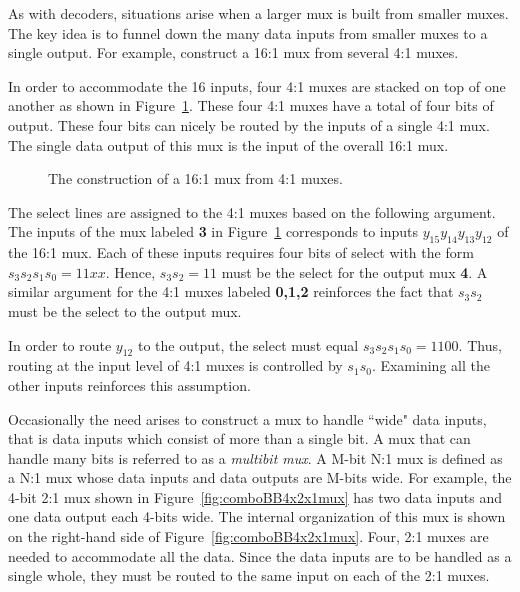 As with decoders, situations arise when a larger
mux is built from smaller muxes.  The key idea is to funnel down the many data 
inputs from smaller muxes to a single output.  For example, construct 
a 16:1 mux from several 4:1 muxes.  

In order to accommodate the 16 inputs, four 4:1 muxes are stacked
on top of one another as shown in Figure~\ref{fig:comboBBBigMux}.  These
four 4:1 muxes have a total of four bits of output.  These four bits
can nicely be routed by the inputs of a single 4:1 mux.  The
single data output of this mux is the input of the overall 16:1 mux.

\begin{figure}[ht]
\caption{The construction of a 16:1 mux from 4:1 muxes.}
\label{fig:comboBBBigMux}
\end{figure}

The select lines are assigned to the 4:1 muxes based on the following 
argument.  The inputs of the mux labeled \textbf{ 3} in
Figure~\ref{fig:comboBBBigMux} corresponds to inputs $y_{15} y_{14} y_{13} y_{12}$ 
of the 16:1 mux.  Each of these inputs requires four bits of 
select with the form $s_3 s_2 s_1 s_0 = 11xx$.  Hence, $s_3 s_2 = 11$ 
must be the select for the output mux \textbf{ 4}.  
A similar argument for the 4:1
muxes labeled \textbf{ 0,1,2} reinforces the fact that $s_3 s_2$ must be 
the select to the output mux.

In order to route $y_{12}$ to the output, the select must equal
$s_3 s_2 s_1 s_0 = 1100$.  Thus, routing at the input level of 4:1 
muxes is controlled by $s_1 s_0$.  Examining all the other 
inputs reinforces this assumption.

Occasionally the need arises to construct a mux to handle
``wide" data inputs, that is data inputs which consist of more than
a single bit.  A mux that can handle many bits is referred to 
as a \textit{ multibit mux}.  \label{multibit mux} A M-bit N:1 mux is 
defined as a N:1 mux whose data inputs and data outputs are M-bits
wide.  For example, the 4-bit 2:1 mux shown in Figure~\ref{fig:comboBB4x2x1mux} 
has two data inputs and one data output each 4-bits wide.  The internal
organization of this mux is shown on the right-hand side of 
Figure~\ref{fig:comboBB4x2x1mux}.  Four, 2:1 muxes are needed to 
accommodate all the data.  Since the data inputs are to 
be handled as a single whole, they must be routed to the
same input on each of the 2:1 muxes.
\label{page:wmu}

